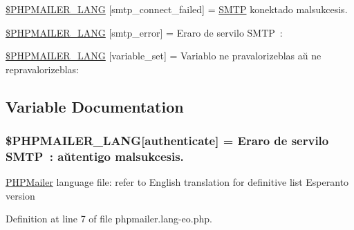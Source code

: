 \begin{DoxyCompactItemize}
\item 
\hyperlink{phpmailer_8lang-eo_8php_a7b321d4ca1e9df702403ed4c61aa0980}{\$\+P\+H\+P\+M\+A\+I\+L\+E\+R\+\_\+\+L\+A\+NG} \mbox{[}\textquotesingle{}smtp\+\_\+connect\+\_\+failed\textquotesingle{}\mbox{]} = \textquotesingle{}\hyperlink{class_s_m_t_p}{S\+M\+TP} konektado malsukcesis.\textquotesingle{}
\item 
\hyperlink{phpmailer_8lang-eo_8php_a7d9cffba1e669c845f8a4c891ee50064}{\$\+P\+H\+P\+M\+A\+I\+L\+E\+R\+\_\+\+L\+A\+NG} \mbox{[}\textquotesingle{}smtp\+\_\+error\textquotesingle{}\mbox{]} = \textquotesingle{}Eraro de servilo S\+M\+T\+P \+: \textquotesingle{}
\item 
\hyperlink{phpmailer_8lang-eo_8php_af795debc7a739d038742691c358d9032}{\$\+P\+H\+P\+M\+A\+I\+L\+E\+R\+\_\+\+L\+A\+NG} \mbox{[}\textquotesingle{}variable\+\_\+set\textquotesingle{}\mbox{]} = \textquotesingle{}Variablo ne pravalorizeblas aŭ ne repravalorizeblas\+: \textquotesingle{}
\end{DoxyCompactItemize}


\subsection{Variable Documentation}
\subsubsection[{\texorpdfstring{\$\+P\+H\+P\+M\+A\+I\+L\+E\+R\+\_\+\+L\+A\+NG}{$PHPMAILER_LANG}}]{\setlength{\rightskip}{0pt plus 5cm}\$P\+H\+P\+M\+A\+I\+L\+E\+R\+\_\+\+L\+A\+NG\mbox{[}\textquotesingle{}authenticate\textquotesingle{}\mbox{]} = \textquotesingle{}Eraro de servilo S\+M\+T\+P \+: aŭtentigo malsukcesis.\textquotesingle{}}\hypertarget{phpmailer_8lang-eo_8php_a2cb33073c989b85580748e331ed8b4aa}{}\label{phpmailer_8lang-eo_8php_a2cb33073c989b85580748e331ed8b4aa}
\hyperlink{class_p_h_p_mailer}{P\+H\+P\+Mailer} language file\+: refer to English translation for definitive list Esperanto version 

Definition at line 7 of file phpmailer.\+lang-\/eo.\+php.

